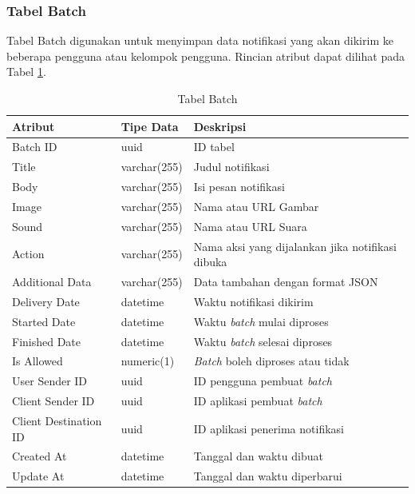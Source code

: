 \subsubsection{Tabel Batch}
\par Tabel Batch digunakan untuk menyimpan data notifikasi yang akan dikirim ke beberapa pengguna atau kelompok pengguna. Rincian atribut dapat dilihat pada Tabel \ref{tabel_batch}.
\begin{longtable}{|p{2cm}|p{2.5cm}|p{4.5cm}|}
	\caption{Tabel Batch} \label{tabel_batch} \\ \hline
    \rowcolor{lightgray} {Atribut} & {Tipe Data} & {Deskripsi} \\ \hline
    \endhead
    Batch ID & uuid & ID tabel \\ \hline
    Title & varchar(255) & Judul notifikasi \\ \hline
    Body & varchar(255) & Isi pesan notifikasi \\ \hline
    Image & varchar(255) & Nama atau URL Gambar \\ \hline
    Sound & varchar(255) & Nama atau URL Suara \\ \hline
    Action & varchar(255) & Nama aksi yang dijalankan jika notifikasi dibuka \\ \hline
    Additional Data & varchar(255) & Data tambahan dengan format JSON \\ \hline
    Delivery Date & datetime & Waktu notifikasi dikirim \\ \hline
    Started Date & datetime & Waktu \textit{batch} mulai diproses \\ \hline
    Finished Date & datetime & Waktu \textit{batch} selesai diproses \\ \hline
    Is Allowed & numeric(1) & \textit{Batch} boleh diproses atau tidak \\ \hline
    User Sender ID & uuid & ID pengguna pembuat \textit{batch} \\ \hline
    Client Sender ID & uuid & ID aplikasi pembuat \textit{batch} \\ \hline
    Client Destination ID & uuid & ID aplikasi penerima notifikasi \\ \hline
    Created At & datetime & Tanggal dan waktu dibuat \\ \hline
    Update At & datetime & Tanggal dan waktu diperbarui \\ \hline
\end{longtable}

